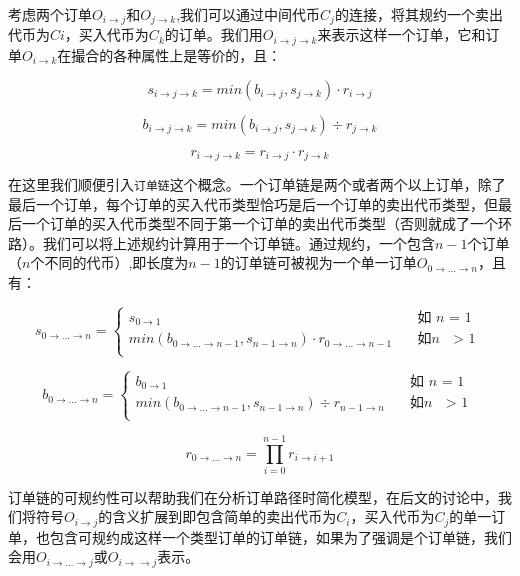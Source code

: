 \documentclass[UTF8,nofonts]{ctexart}
\begin{document}
考虑两个订单$O_{i\rightarrow j}$和$O_{j\rightarrow k}$,我们可以通过中间代币$C_j$的连接，将其规约一个卖出代币为$Ci$，买入代币为$C_k$的订单。我们用$O_{i\rightarrow j\rightarrow k}$来表示这样一个订单，它和订单$O_{i\rightarrow k}$在撮合的各种属性上是等价的，且：

\begin{equation}
s_{i\rightarrow j\rightarrow k}=min(b_{i\rightarrow j},s_{j\rightarrow k}) \cdot r_{i\rightarrow j}
\end{equation}

\begin{equation}
b_{i\rightarrow j\rightarrow k}=min(b_{i\rightarrow j},s_{j\rightarrow k}) \div r_{j\rightarrow k}
\end{equation}

\begin{equation}
r_{i\rightarrow j\rightarrow k}= r_{i\rightarrow j}\cdot r_{j\rightarrow k}
\end{equation}


在这里我们顺便引入\texttt{订单链}这个概念。一个订单链是两个或者两个以上订单，除了最后一个订单，每个订单的买入代币类型恰巧是后一个订单的卖出代币类型，但最后一个订单的买入代币类型不同于第一个订单的卖出代币类型（否则就成了一个环路）。我们可以将上述规约计算用于一个订单链。通过规约，一个包含$n-1$个订单（$n$个不同的代币）,即长度为$n-1$的订单链可被视为一个单一订单$O_{0\rightarrow ...\rightarrow n}$，且有：

\[ s_{0\rightarrow ...\rightarrow n} =
  \begin{cases}
    s_{0\rightarrow 1}      & \quad \text{如 } n \text{ = 1}\\
    min(b_{0\rightarrow ...\rightarrow n-1},s_{n-1\rightarrow n}) \cdot r_{0\rightarrow ...\rightarrow n-1}  & \quad \text{如} n \text{ $>$ 1}\\
  \end{cases}
\]

\[ b_{0\rightarrow ...\rightarrow n} =
  \begin{cases}
    b_{0\rightarrow 1}      & \quad \text{如 } n \text{ = 1}\\
    min(b_{0\rightarrow ...\rightarrow n-1},s_{n-1\rightarrow n}) \div r_{n-1\rightarrow n}  & \quad \text{如} n \text{ $>$ 1}\\
  \end{cases}
\]


\[ r_{0\rightarrow ...\rightarrow n} = \prod_{i=0}^{n-1}{r_{i\rightarrow i+1}}
\]


订单链的可规约性可以帮助我们在分析订单路径时简化模型，在后文的讨论中，我们将符号$O_{i \rightarrow j}$的含义扩展到即包含简单的卖出代币为$C_i$，买入代币为$C_j$的单一订单，也包含可规约成这样一个类型订单的订单链，如果为了强调是个订单链，我们会用$O_{i \rightarrow ...\rightarrow j}$或$O_{i \rightarrow \rightarrow j}$表示。
\end{document}
